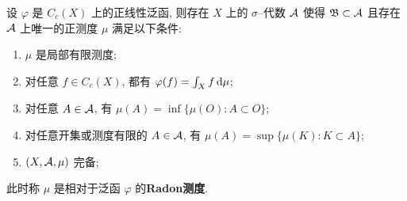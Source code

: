 	\begin{Proposition}[Riesz]
		设 $ \varphi $ 是 $ C_c(X) $ 上的正线性泛函, 则存在 $ X $ 上的 $ \sigma $--代数 $ \mathcal{A} $ 使得 $ \mathfrak{B}\subset\mathcal{A} $ 且存在 $ \mathcal{A} $ 上唯一的正测度 $ \mu $ 满足以下条件:
		\begin{enumerate}[(1)]
			\item $ \mu $ 是局部有限测度;
			\item 对任意 $ f\in C_c(X) $, 都有 $ \varphi(f)=\int_Xf\,\mathrm{d}\mu $;
			\item 对任意 $ A\in\mathcal{A} $, 有 $ \mu(A)=\inf\{\mu(O) : A\subset O\} $;
			\item 对任意开集或测度有限的 $ A\in\mathcal{A} $, 有 $ \mu(A)=\sup\{\mu(K) : K\subset A\} $;
			\item $ (X,\mathcal{A},\mu) $ 完备;
		\end{enumerate}
		此时称 $ \mu $ 是相对于泛函 $ \varphi $ 的\textbf{Radon测度}.
	\end{Proposition}
